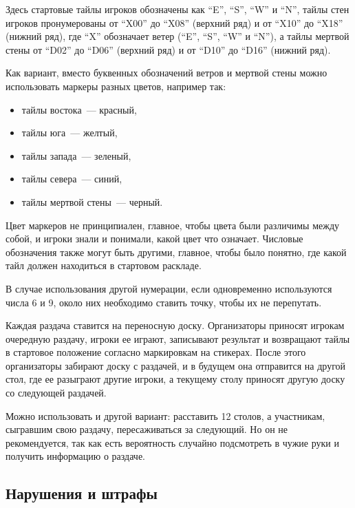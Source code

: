 \begin{additional}
Здесь стартовые тайлы игроков обозначены как ``E'', ``S'', ``W'' и ``N'', тайлы стен игроков пронумерованы от ``X00'' до ``X08'' (верхний ряд) и от ``X10'' до ``X18'' (нижний ряд), где ``X'' обозначает ветер (``E'', ``S'', ``W'' и ``N''), а тайлы мертвой стены от ``D02'' до ``D06'' (верхний ряд) и от ``D10'' до ``D16'' (нижний ряд).

\vspace{0.3cm}

Как вариант, вместо буквенных обозначений ветров и мертвой стены можно использовать маркеры разных цветов, например так:

\begin{itemize}
	\item тайлы востока~--- красный,
	\item тайлы юга~--- желтый,
	\item тайлы запада~--- зеленый,
	\item тайлы севера~--- синий,
	\item тайлы мертвой стены~--- черный.
\end{itemize}

Цвет маркеров не принципиален, главное, чтобы цвета были различимы между собой, и игроки знали и понимали, какой цвет что означает. Числовые обозначения также могут быть другими, главное, чтобы было понятно, где какой тайл должен находиться в стартовом раскладе.

В случае использования другой нумерации, если одновременно используются числа 6 и 9, около них необходимо ставить точку, чтобы их не перепутать.

\vspace{0.3cm}

Каждая раздача ставится на переносную доску. Организаторы приносят игрокам очередную раздачу, игроки ее играют, записывают результат и возвращают тайлы в стартовое положение согласно маркировкам на стикерах. После этого организаторы забирают доску с раздачей, и в будущем она отправится на другой стол, где ее разыграют другие игроки, а текущему столу приносят другую доску со следующей раздачей.

Можно использовать и другой вариант: расставить 12 столов, а участникам, сыгравшим свою раздачу, пересаживаться за следующий. Но он не рекомендуется, так как есть вероятность случайно подсмотреть в чужие руки и получить информацию о раздаче.

\subsection{Нарушения и штрафы}


\end{additional}
